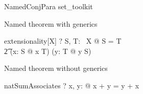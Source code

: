 \begin{zsection}
  \SECTION NamedConjPara \parents set\_toolkit
\end{zsection}

Named theorem with generics
\begin{theorem}{extensionality}[X]
   \vdash? \forall S, T: \power~X @ S = T \iff \\
        \t2 (\forall x: S @ x \in T) \land (\forall y: T @ y \in S)
\end{theorem}

Named theorem without generics
\begin{theorem}{natSumAssociates}
   \vdash? \forall x, y: \nat @ x + y = y + x
\end{theorem}